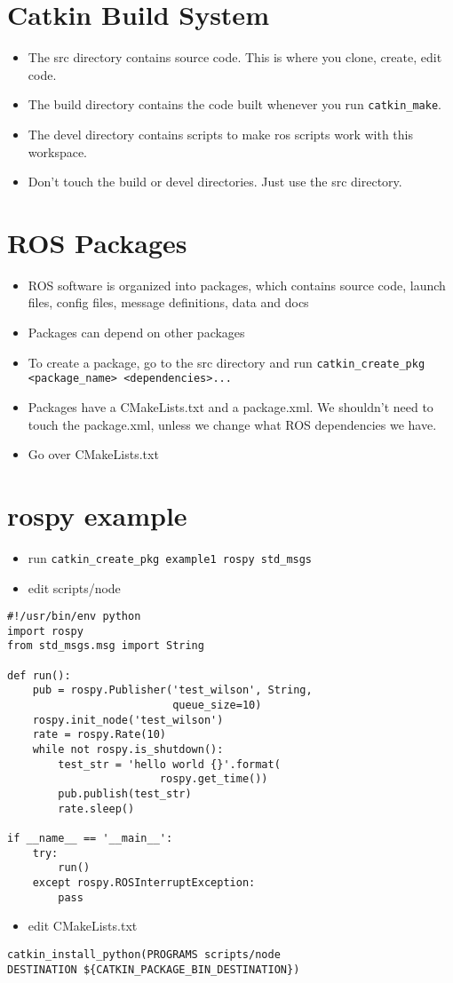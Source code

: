 \documentclass{article}
\begin{document}
\section{Catkin Build System}
\begin{itemize}
    \item The src directory contains source code. This is where you clone, create, edit code.
    \item The build directory contains the code built whenever you run \lstinline{catkin_make}.
    \item The devel directory contains scripts to make ros scripts work with this workspace.
    \item Don't touch the build or devel directories. Just use the src directory.
\end{itemize}
\section{ROS Packages}
\begin{itemize}
    \item ROS software is organized into packages, which contains source code, launch files, config files, message definitions, data and docs
    \item Packages can depend on other packages
    \item To create a package, go to the src directory and run \lstinline{catkin_create_pkg <package_name> <dependencies>...}
    \item Packages have a CMakeLists.txt and a package.xml. We shouldn't need to touch the package.xml, unless we change what ROS dependencies we have.
    \item Go over CMakeLists.txt
\end{itemize}
\section{rospy example}
\begin{itemize}
    \item run \lstinline{catkin_create_pkg example1 rospy std_msgs}
    \item edit scripts/node
\end{itemize}
\begin{lstlisting}
#!/usr/bin/env python
import rospy
from std_msgs.msg import String

def run():
    pub = rospy.Publisher('test_wilson', String, 
                          queue_size=10)
    rospy.init_node('test_wilson')
    rate = rospy.Rate(10)
    while not rospy.is_shutdown():
        test_str = 'hello world {}'.format(
                        rospy.get_time())
        pub.publish(test_str)
        rate.sleep()

if __name__ == '__main__':
    try:
        run()
    except rospy.ROSInterruptException:
        pass
\end{lstlisting}
\begin{itemize}
    \item edit CMakeLists.txt
\end{itemize}
\begin{lstlisting}
catkin_install_python(PROGRAMS scripts/node 
DESTINATION ${CATKIN_PACKAGE_BIN_DESTINATION})
\end{lstlisting}
\end{document}
